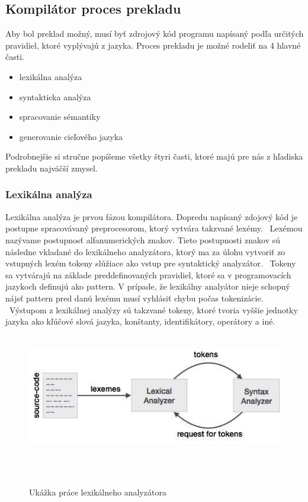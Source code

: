 \subsection{Kompilátor proces prekladu}
Aby bol preklad možný, musí byť zdrojový kód programu napísaný podľa určitých pravidiel, ktoré vyplývajú z jazyka. Proces prekladu je možné rodeliť na 4 hlavné časti.
\begin{itemize}
	\item lexikálna analýza
	\item syntakticka analýza
	\item spracovanie sémantiky
	\item generovanie cieľového jazyka
\end{itemize}
\indent Podrobnejšie si stručne popíšeme všetky štyri časti, ktoré majú pre nás z hľadiska prekladu najväčší zmysel.
\newline
\subsubsection{Lexikálna analýza}
	\indent Lexikálna analýza je prvou fázou kompilátora. Dopredu napísaný zdojový kód je postupne spracovávaný preprocesorom, ktorý vytvára takzvané lexémy. 
	 \newline Lexémou nazývame postupnosť alfanumerických znakov. Tieto postupnosti znakov sú následne vkladané do lexikálneho analyzátora, ktorý ma za úlohu vytvoriť zo vstupných lexém tokeny slúžiace ako vstup pre syntaktický analyzátor. 
	 \newline Tokeny sa vytvárajú na základe preddefinovaných pravidiel, ktoré sa v programovacích jazykoch definujú ako pattern. V prípade, že lexikálny analyátor nieje schopný nájsť  pattern pred danú lexému musí vyhlásiť chybu počas tokenizácie.  
	 \newline Výstupom z lexikálnej analýzy sú takzvané tokeny, ktoré tvoria vyššie jednotky jazyka ako kľúčové slová jazyka, konštanty, identifikátory, operátory a iné.\cite{gram}
	 
	 \begin{figure}[!htbp]
	 	\centering
	 	\includegraphics[width=15cm]{img/lexical_analysis.jpg}
	 	\caption{Ukážka práce lexikálneho analyzátora}
	 	\label{fig:test}
	 \end{figure}
 \newline
 
